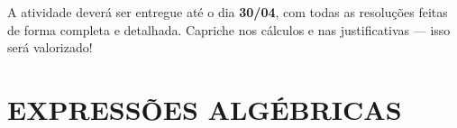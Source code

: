 \documentclass[a4paper]{article}
\begin{document}
	\fontsize{10}{15}\selectfont
	\vspace*{1mm}
	
	\section*{}	
	\begin{tcolorbox}[colback=gray!10, colframe=black, boxrule=0.5mm, arc=4pt, title=\textbf{Orientações}]
		A atividade deverá ser entregue até o dia \textbf{30/04}, com todas as resoluções feitas de forma completa e detalhada. 		
		Capriche nos cálculos e nas justificativas — isso será valorizado!
	\end{tcolorbox}
	
	\section*{EXPRESSÕES ALGÉBRICAS} 
				
\end{document}
